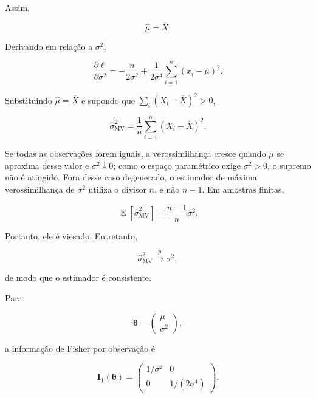 \documentclass[
  letterpaper,
  DIV=11,
  numbers=noendperiod]{scrreprt}
\begin{document}
Assim,

\[\widehat\mu
=
\overline X.\]

Derivando em relação a \(\sigma^2\),

\[\frac{\partial\ell}{\partial\sigma^2}
=
-\frac{n}{2\sigma^2}
+
\frac{1}{2\sigma^4}
\sum_{i=1}^n
(x_i-\mu)^2.\]

Substituindo \(\widehat\mu=\overline X\) e supondo que
\(\sum_i(X_i-\overline X)^2>0\),

\[\widehat{\sigma}^2_{\mathrm{MV}}
=
\frac{1}{n}
\sum_{i=1}^n
(X_i-\overline X)^2.\]

\begin{tcolorbox}[enhanced jigsaw, colback=white, leftrule=.75mm, colbacktitle=quarto-callout-note-color!10!white, breakable, titlerule=0mm, bottomtitle=1mm, title=\textcolor{quarto-callout-note-color}{\faInfo}\hspace{0.5em}{Observação --- existência e viés}, colframe=quarto-callout-note-color-frame, toprule=.15mm, opacityback=0, bottomrule=.15mm, opacitybacktitle=0.6, arc=.35mm, toptitle=1mm, rightrule=.15mm, coltitle=black, left=2mm]

Se todas as observações forem iguais, a verossimilhança cresce quando
\(\mu\) se aproxima desse valor e \(\sigma^2\downarrow0\); como o espaço
paramétrico exige \(\sigma^2>0\), o supremo não é atingido. Fora desse
caso degenerado, o estimador de máxima verossimilhança de \(\sigma^2\)
utiliza o divisor \(n\), e não \(n-1\). Em amostras finitas,

\[\operatorname{E}
\left[
\widehat{\sigma}^2_{\mathrm{MV}}
\right]
=
\frac{n-1}{n}\sigma^2.\]

Portanto, ele é viesado. Entretanto,

\[\widehat{\sigma}^2_{\mathrm{MV}}
\xrightarrow{p}
\sigma^2,\]

de modo que o estimador é consistente.

\end{tcolorbox}

Para

\[\boldsymbol\theta
=
\begin{pmatrix}
\mu\\
\sigma^2
\end{pmatrix},\]

a informação de Fisher por observação é

\[\mathbf{I}_1(\boldsymbol\theta)
=
\begin{pmatrix}
1/\sigma^2 & 0\\
0 & 1/(2\sigma^4)
\end{pmatrix}.\]
\end{document}

